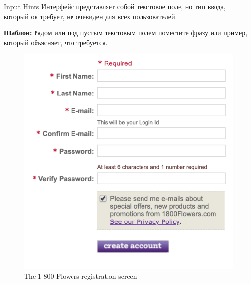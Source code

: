 \documentclass{beamer}
\begin{document}
\begin{frame}[t]{Input Hints}
	Интерфейс представляет собой текстовое поле, но тип ввода, который он требует, не очевиден для всех
пользователей.

	\textbf{Шаблон:} Рядом или под пустым текстовым полем поместите фразу или пример, который объясняет, что
требуется.
	\begin{figure}[h]
		\centering
		\includegraphics[scale=0.3]{images/lec08-pic41.png}
		\caption{The 1-800-Flowers registration screen}
	\end{figure}
\end{frame}
\end{document}

